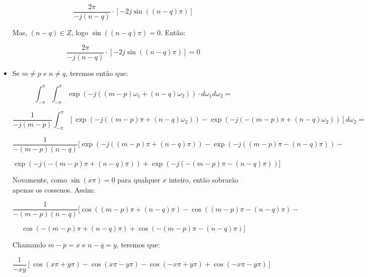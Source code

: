 \documentclass[]{abntex2}
\begin{document}
\begin{itemize}
	\begin{equation*}
		\dfrac{2\pi}{-j (n-q)}\cdot [- 2j\sin ((n-q) \pi)]
	\end{equation*}

	Mas, $(n-q)\in Z$, logo $\sin((n-q)\pi) = 0$. Então: 

	\begin{equation*}
		\dfrac{2\pi}{-j (n-q)}\cdot [- 2j\sin ((n-q) \pi)] = 0 
	\end{equation*}

	\item Se $m \neq p$ e $n\neq q$, teremos então que:
	
	\begin{equation*}
		\int_{-\pi}^{\pi} \int_{-\pi}^{\pi}\exp \left( -j ((m-p) \omega_1 + (n-q) \omega_2) \right) \cdot d\omega_1 d\omega_2 = 
	\end{equation*}

	\begin{equation*}
		\dfrac{1}{-j(m-p)} \int_{-\pi}^{\pi} [\exp \left( -j ((m-p) \pi + (n-q) \omega_2) \right) - \exp \left( -j (-(m-p)\pi + (n-q) \omega_2) \right) ]d\omega_2 = 
	\end{equation*}
	
	\begin{equation*}
		\dfrac{1}{-(m-p)(n-q)} [\exp \left( -j ((m-p) \pi + (n-q) \pi) \right) - \exp \left( -j ((m-p) \pi - (n-q) \pi) \right) -  
	\end{equation*}

	\begin{equation*}
		\exp \left( -j (-(m-p)\pi + (n-q) \pi) \right) + \exp \left( -j (-(m-p)\pi - (n-q) \pi) \right)] 
	\end{equation*}

	Novamente, como $\sin(x\pi) = 0$ para qualquer $x$ inteiro, então sobrarão apenas os cossenos. Assim:

	\begin{equation*}
		\dfrac{1}{-(m-p)(n-q)} [\cos \left((m-p) \pi + (n-q) \pi \right) - \cos \left((m-p) \pi - (n-q) \pi \right) -
	\end{equation*}
	
	\begin{equation*}
		\cos \left(-(m-p)\pi + (n-q) \pi \right) + \cos \left(-(m-p)\pi - (n-q) \pi \right)] 
	\end{equation*}

	Chamando $m-p = x$ e $n-q=y$, teremos que:

	\begin{equation*}
		\dfrac{1}{-xy} [\cos \left(x \pi + y \pi \right) - \cos \left(x \pi - y \pi \right) - \cos \left(-x\pi + y \pi \right) + \cos \left(-x\pi - y \pi \right)] 
	\end{equation*}


\end{itemize}
\end{document}

